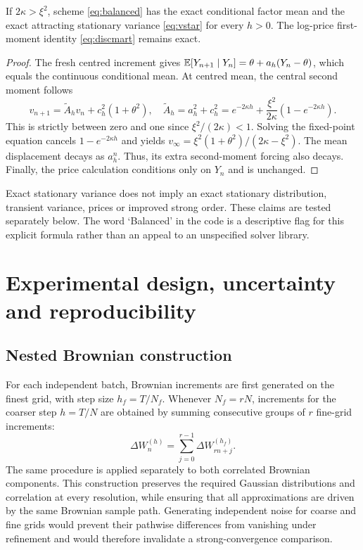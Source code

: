 \begin{proposition}\label{prop:balanced}
If $2\kappa>\xi^2$, scheme \eqref{eq:balanced} has the exact conditional factor mean and the exact attracting stationary variance \eqref{eq:vstar} for every $h>0$. The log-price first-moment identity \eqref{eq:discmart} remains exact.
\end{proposition}
\begin{proof}
The fresh centred increment gives $\mathbb E[Y_{n+1}\mid Y_n]=\theta+a_h(Y_n-\theta)$, which equals the continuous conditional mean. At centred mean, the central second moment follows
\begin{equation}
v_{n+1}=\widetilde A_hv_n+c_h^2(1+\theta^2),\quad
\widetilde A_h=a_h^2+c_h^2=e^{-2\kappa h}+\frac{\xi^2}{2\kappa}(1-e^{-2\kappa h}).
\end{equation}
This is strictly between zero and one since $\xi^2/(2\kappa)<1$. Solving the fixed-point equation cancels $1-e^{-2\kappa h}$ and yields $v_\infty=\xi^2(1+\theta^2)/(2\kappa-\xi^2)$. The mean displacement decays as $a_h^n$. Thus, its extra second-moment forcing also decays. Finally, the price calculation conditions only on $Y_n$ and is unchanged.
\end{proof}
Exact stationary variance does not imply an exact stationary distribution, transient variance, prices or improved strong order. These claims are tested separately below. The word `Balanced' in the code is a descriptive flag for this explicit formula rather than an appeal to an unspecified solver library.

\section{Experimental design, uncertainty and reproducibility}
\label{sec:design}
\subsection{Nested Brownian construction}
For each independent batch, Brownian increments are first generated on the finest grid, with step size $h_f=T/N_f$. Whenever $N_f=rN$, increments for the coarser step $h=T/N$ are obtained by summing consecutive groups of $r$ fine-grid increments:
\begin{equation}\label{eq:coupling}\Delta W_n^{(h)}=\sum_{j=0}^{r-1}\Delta W_{rn+j}^{(h_f)}.
\end{equation}
The same procedure is applied separately to both correlated Brownian components. This construction preserves the required Gaussian distributions and correlation at every resolution, while ensuring that all approximations are driven by the same Brownian sample path. Generating independent noise for coarse and fine grids would prevent their pathwise differences from vanishing under refinement and would therefore invalidate a strong-convergence comparison.

